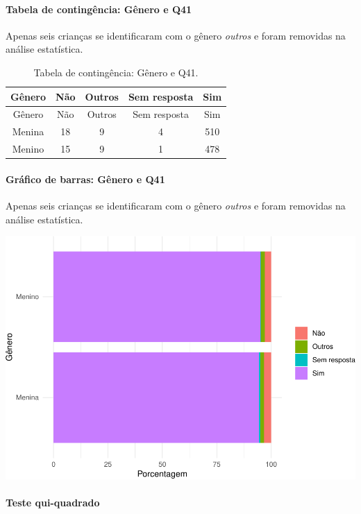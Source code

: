 \documentclass[]{article}
\let\oldparagraph\paragraph
\renewcommand{\paragraph}[1]{\oldparagraph{#1}\mbox{}}
\begin{document}
\cleardoublepage

\hypertarget{tabela-de-continguxeancia-guxeanero-e-q41}{%
\paragraph{Tabela de contingência: Gênero e Q41}\label{tabela-de-continguxeancia-guxeanero-e-q41}}

Apenas seis crianças se identificaram com o gênero \emph{outros} e foram removidas na análise estatística.

\begin{longtable}[]{@{}ccccc@{}}
\caption{\label{tab:unnamed-chunk-1616}Tabela de contingência: Gênero e Q41.}\tabularnewline
\toprule
Gênero & Não & Outros & Sem resposta & Sim\tabularnewline
\midrule
\endfirsthead
\toprule
Gênero & Não & Outros & Sem resposta & Sim\tabularnewline
\midrule
\endhead
Menina & 18 & 9 & 4 & 510\tabularnewline
Menino & 15 & 9 & 1 & 478\tabularnewline
\bottomrule
\end{longtable}

\hypertarget{gruxe1fico-de-barras-guxeanero-e-q41}{%
\paragraph{Gráfico de barras: Gênero e Q41}\label{gruxe1fico-de-barras-guxeanero-e-q41}}

Apenas seis crianças se identificaram com o gênero \emph{outros} e foram removidas na análise estatística.

\begin{center}\includegraphics[width=0.75\linewidth]{relatorio_covid19_files/figure-latex/unnamed-chunk-1617-1} \end{center}

\hypertarget{teste-qui-quadrado-138}{%
\paragraph{Teste qui-quadrado}\label{teste-qui-quadrado-138}}
\end{document}
